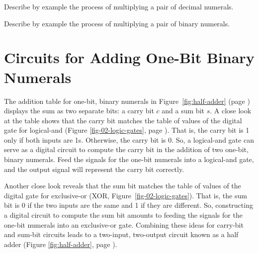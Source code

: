 \begin{ExerciseList}
\Exercise Describe by example the process of multiplying a pair of decimal numerals.

\Exercise Describe by example the process of multiplying a pair of binary numerals.
\end{ExerciseList}

\section{Circuits for Adding One-Bit Binary Numerals}
\label{sec:adding-1-bit-numerals}

The addition table for one-bit, binary numerals
in Figure~\ref{fig:half-adder} (page \pageref{fig:half-adder})
displays the sum as two separate bits:
a carry bit $c$ and a sum bit $s$.
A close look at the table shows that
the carry bit matches the table of values of the
digital gate for logical-and
(Figure \ref{fig-02-logic-gates}, page \pageref{fig-02-logic-gates}).
That is, the carry bit is 1 only if both inputs are 1s.
Otherwise, the carry bit is 0.
So, a logical-and gate can serve
as a digital circuit to compute the carry bit
in the addition of two one-bit, binary numerals.
Feed the signals for the one-bit numerals
into a logical-and gate, and the output signal
will represent the carry bit correctly.

Another close look reveals that the sum bit
matches the table of values of the
digital gate for exclusive-or
(XOR, Figure~\ref{fig-02-logic-gates}).
That is, the sum bit is 0 if the two inputs are the same
and 1 if they are different.
So, constructing a digital circuit to compute the sum bit
amounts to feeding the signals for the one-bit numerals
into an exclusive-or gate.
Combining these ideas for carry-bit and sum-bit circuits
leads to a two-input, two-output circuit known as a
half adder (Figure \ref{fig:half-adder}, page \pageref{fig:half-adder}).

